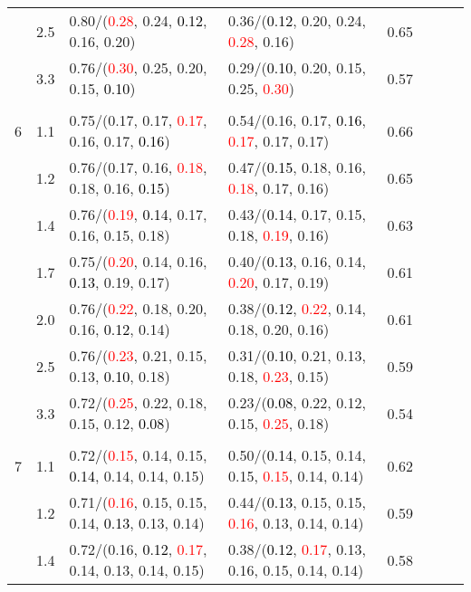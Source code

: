 \documentclass[10pt,a4paper]{report}
\begin{document}
\begin{table}[!htbp]
\begin{center}
{\begin{tabular}{ccllcccc}
			&2.5&0.80/(\textcolor{red}{0.28}, 0.24, \textcolor{black}{0.12}, 0.16, 0.20)&0.36/(\textcolor{black}{0.12}, 0.20, 0.24, \textcolor{red}{0.28}, 0.16)&0.65\\
			&3.3&0.76/(\textcolor{red}{0.30}, 0.25, 0.20, 0.15, \textcolor{black}{0.10})&0.29/(\textcolor{black}{0.10}, 0.20, 0.15, 0.25, \textcolor{red}{0.30})&0.57\\
			&&&&\\
			6			&1.1&0.75/(0.17, 0.17, \textcolor{red}{0.17}, 0.16, 0.17, \textcolor{black}{0.16})&0.54/(0.16, 0.17, \textcolor{black}{0.16}, \textcolor{red}{0.17}, 0.17, 0.17)&0.66\\
			&1.2&0.76/(0.17, 0.16, \textcolor{red}{0.18}, 0.18, 0.16, \textcolor{black}{0.15})&0.47/(\textcolor{black}{0.15}, 0.18, 0.16, \textcolor{red}{0.18}, 0.17, 0.16)&0.65\\
			&1.4&0.76/(\textcolor{red}{0.19}, \textcolor{black}{0.14}, 0.17, 0.16, 0.15, 0.18)&0.43/(\textcolor{black}{0.14}, 0.17, 0.15, 0.18, \textcolor{red}{0.19}, 0.16)&0.63\\
			&1.7&0.75/(\textcolor{red}{0.20}, 0.14, 0.16, \textcolor{black}{0.13}, 0.19, 0.17)&0.40/(\textcolor{black}{0.13}, 0.16, 0.14, \textcolor{red}{0.20}, 0.17, 0.19)&0.61\\
			&2.0&0.76/(\textcolor{red}{0.22}, 0.18, 0.20, 0.16, \textcolor{black}{0.12}, 0.14)&0.38/(\textcolor{black}{0.12}, \textcolor{red}{0.22}, 0.14, 0.18, 0.20, 0.16)&0.61\\
			&2.5&0.76/(\textcolor{red}{0.23}, 0.21, 0.15, 0.13, \textcolor{black}{0.10}, 0.18)&0.31/(\textcolor{black}{0.10}, 0.21, 0.13, 0.18, \textcolor{red}{0.23}, 0.15)&0.59\\
			&3.3&0.72/(\textcolor{red}{0.25}, 0.22, 0.18, 0.15, 0.12, \textcolor{black}{0.08})&0.23/(\textcolor{black}{0.08}, 0.22, 0.12, 0.15, \textcolor{red}{0.25}, 0.18)&0.54\\
			&&&&\\
			7			&1.1&0.72/(\textcolor{red}{0.15}, 0.14, 0.15, \textcolor{black}{0.14}, 0.14, 0.14, 0.15)&0.50/(\textcolor{black}{0.14}, 0.15, 0.14, 0.15, \textcolor{red}{0.15}, 0.14, 0.14)&0.62\\
			&1.2&0.71/(\textcolor{red}{0.16}, 0.15, 0.15, 0.14, \textcolor{black}{0.13}, 0.13, 0.14)&0.44/(\textcolor{black}{0.13}, 0.15, 0.15, \textcolor{red}{0.16}, 0.13, 0.14, 0.14)&0.59\\
			&1.4&0.72/(0.16, \textcolor{black}{0.12}, \textcolor{red}{0.17}, 0.14, 0.13, 0.14, 0.15)&0.38/(\textcolor{black}{0.12}, \textcolor{red}{0.17}, 0.13, 0.16, 0.15, 0.14, 0.14)&0.58\\

\end{tabular}}
\end{center}
\end{table}
\end{document}
